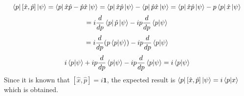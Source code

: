 \begin{sol}
\begin{enumerate}[label=\textbf{(\alph*)}]
\begin{equation}
	\bra p[\hat x,\hat p]\ket\psi=\bra p\hat x\hat p-\hat p\hat x\ket\psi=\bra p\hat x\hat p\ket\psi-\bra p\hat p\hat x\ket\psi=\bra p\hat x\hat p\ket\psi-p\bra p\hat x\ket\psi
\end{equation}  
\begin{equation}
	=i\frac{d}{dp}\bra p\hat p\ket\psi-ip\frac{d}{dp}\braket{p}{\psi}
\end{equation}
\begin{equation}
	=i\frac{d}{dp}(p\braket{p}{\psi})-ip\frac{d}{dp}\braket{p}{\psi}
\end{equation}
\begin{equation}
	i\braket{p}{\psi}+ip\frac{d}{dp}\braket{p}{\psi}-ip\frac{d}{dp}\braket{p}{\psi}=i\braket{p}{\psi}
\end{equation} 
Since it is known that $[\hat x,\hat p]=i\mathbf{1}$, the expected result is $\bra p[\hat x,\hat p]\ket\psi=i\braket{p}{x}$ which is obtained.

\end{enumerate}
\end{sol}